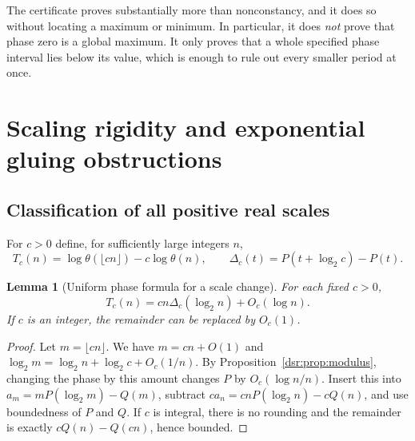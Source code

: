 \documentclass[11pt,a4paper]{article}
\numberwithin{equation}{section}
\newtheorem{lemma}[theorem]{Lemma}
\theoremstyle{definition}
\theoremstyle{remark}
\theoremstyle{definition}
\theoremstyle{plain}
\begin{document}
The certificate proves substantially more than nonconstancy, and it does so
without locating a maximum or minimum. In particular, it does \emph{not}
prove that phase zero is a global maximum. It only proves that a whole
specified phase interval lies below its value, which is enough to rule out
every smaller period at once.

\section{Scaling rigidity and exponential gluing obstructions}
\label{dsr:sec:rigidity}

\subsection{Classification of all positive real scales}
For $c>0$ define, for sufficiently large integers $n$,
\begin{equation}
 T_c(n)=\log\theta(\lfloor cn\rfloor)-c\log\theta(n),
 \qquad
 \Delta_c(t)=P(t+\log_2c)-P(t).
\end{equation}

\begin{lemma}[Uniform phase formula for a scale change]
\label{dsr:lem:scale-formula}
For each fixed $c>0$,
\begin{equation}
 T_c(n)=cn\Delta_c(\log_2n)+O_c(\log n).
\label{dsr:eq:scale-formula}
\end{equation}
If $c$ is an integer, the remainder can be replaced by $O_c(1)$.
\end{lemma}
\begin{proof}
Let $m=\lfloor cn\rfloor$. We have $m=cn+O(1)$ and
$\log_2m=\log_2n+\log_2c+O_c(1/n)$. By
Proposition~\ref{dsr:prop:modulus}, changing the phase by this amount changes $P$
by $O_c(\log n/n)$. Insert this into
$a_m=mP(\log_2m)-Q(m)$, subtract
$ca_n=cnP(\log_2n)-cQ(n)$, and use boundedness of $P$ and $Q$.
If $c$ is integral, there is no rounding and the remainder is exactly
$cQ(n)-Q(cn)$, hence bounded.
\end{proof}
\end{document}
